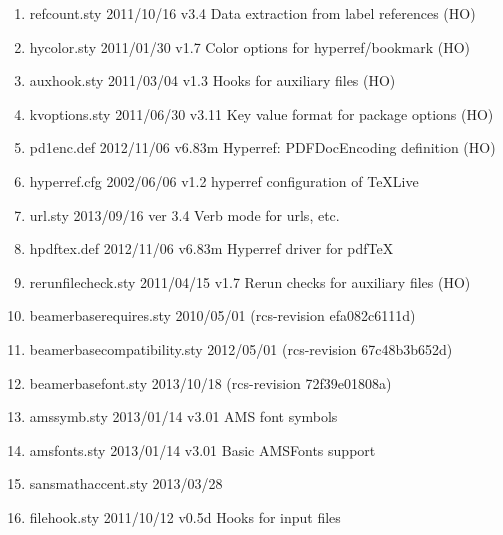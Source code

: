 \begin{enumerate}
\item refcount.sty 2011/10/16 v3.4 Data extraction from label references (HO)
\item hycolor.sty 2011/01/30 v1.7 Color options for hyperref/bookmark (HO)
\item auxhook.sty 2011/03/04 v1.3 Hooks for auxiliary files (HO)
\item kvoptions.sty 2011/06/30 v3.11 Key value format for package options (HO)
\item pd1enc.def 2012/11/06 v6.83m Hyperref: PDFDocEncoding definition (HO)
\item hyperref.cfg 2002/06/06 v1.2 hyperref configuration of TeXLive
\item url.sty 2013/09/16 ver 3.4 Verb mode for urls, etc.
\item hpdftex.def 2012/11/06 v6.83m Hyperref driver for pdfTeX
\item rerunfilecheck.sty 2011/04/15 v1.7 Rerun checks for auxiliary files (HO)
\item beamerbaserequires.sty 2010/05/01 (rcs-revision efa082c6111d)
\item beamerbasecompatibility.sty 2012/05/01 (rcs-revision 67c48b3b652d)
\item beamerbasefont.sty 2013/10/18 (rcs-revision 72f39e01808a)
\item amssymb.sty 2013/01/14 v3.01 AMS font symbols
\item amsfonts.sty 2013/01/14 v3.01 Basic AMSFonts support
\item sansmathaccent.sty 2013/03/28
\item filehook.sty 2011/10/12 v0.5d Hooks for input files

\end{enumerate}
